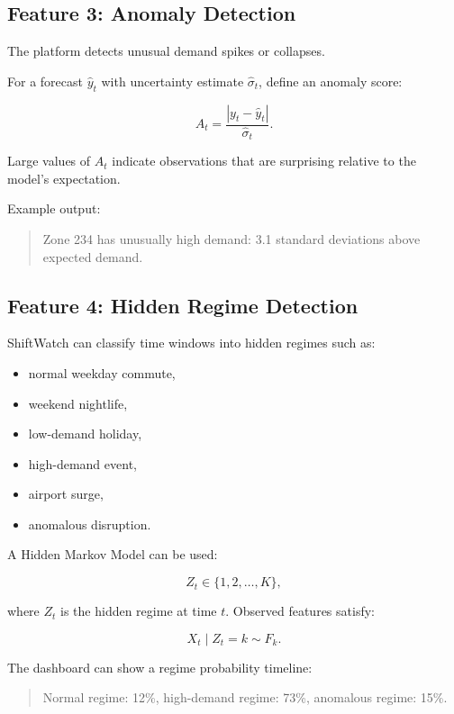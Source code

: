 \documentclass[11pt]{article}
\begin{document}
\subsection{Feature 3: Anomaly Detection}

The platform detects unusual demand spikes or collapses.

For a forecast $\hat{y}_t$ with uncertainty estimate $\hat{\sigma}_t$, define an anomaly score:

\[
    A_t = \frac{|y_t - \hat{y}_t|}{\hat{\sigma}_t}.
\]

Large values of $A_t$ indicate observations that are surprising relative to the model's expectation.

Example output:

\begin{quote}
    Zone 234 has unusually high demand: 3.1 standard deviations above expected demand.
\end{quote}

\subsection{Feature 4: Hidden Regime Detection}

ShiftWatch can classify time windows into hidden regimes such as:

\begin{itemize}
    \item normal weekday commute,
    \item weekend nightlife,
    \item low-demand holiday,
    \item high-demand event,
    \item airport surge,
    \item anomalous disruption.
\end{itemize}

A Hidden Markov Model can be used:

\[
    Z_t \in \{1, 2, \ldots, K\},
\]

where $Z_t$ is the hidden regime at time $t$. Observed features satisfy:

\[
    X_t \mid Z_t = k \sim F_k.
\]

The dashboard can show a regime probability timeline:

\begin{quote}
    Normal regime: 12\%, high-demand regime: 73\%, anomalous regime: 15\%.
\end{quote}
\end{document}
